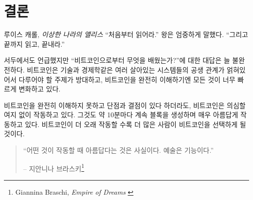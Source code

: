 \label{ch:conclusion}

\chapter*{결론}

\begin{chapquote}{루이스 캐롤, \textit{이상한 나라의 앨리스}}
	\enquote{처음부터 읽어라.} 왕은 엄중하게 말했다. \enquote{그리고 끝까지 읽고, 끝내라.}
\end{chapquote}

\begin{comment}
	As mentioned in the beginning, I think that any answer to the
	question \textit{“What have you learned from Bitcoin?”} will always be incomplete. The
	symbiosis of what can be seen as multiple living systems -- Bitcoin, the
	technosphere, and economics -- is too intertwined, the topics too numerous, and
	things are moving too fast to ever be fully understood by a single person.
\end{comment}
서두에서도 언급했지만 \enquote{비트코인으로부터 무엇을 배웠는가?}에 대한 대답은 늘 불완전하다.
비트코인은 기술과 경제학같은 여러 살아있는 시스템들의 공생 관계가 얽혀있어서 다루어야 할 주제가 방대하고, 
비트코인을 완전히 이해하기엔 모든 것이 너무 빠르게 변화하고 있다. 

\begin{comment}
	Even without understanding it fully, and even with all its quirks and seeming
	shortcomings, Bitcoin undoubtedly works. It keeps producing blocks roughly every
	ten minutes and does so beautifully. The longer Bitcoin continues to work, the
	more people will opt-in to use it.
\end{comment}
비트코인을 완전히 이해하지 못하고 단점과 결점이 있다 하더라도, 비트코인은 의심할 여지 없이 작동하고 있다.
그것도 약 10분마다 계속 블록을 생성하며 매우 아름답게 작동하고 있다.
비트코인이 더 오래 작동할 수록 더 많은 사람이 비트코인을 선택하게 될 것이다.

\begin{quotation}\begin{samepage}
		\enquote{어떤 것이 작동할 때 아름답다는 것은 사실이다. 예술은 기능이다.}
		\begin{flushright} -- 지안니나 브라스키\footnote{Giannina Braschi, \textit{Empire of Dreams} \cite{braschi2011empire}}
\end{flushright}\end{samepage}\end{quotation}

